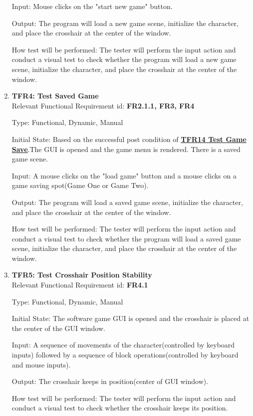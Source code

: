 \documentclass[12pt, titlepage]{article}
\begin{document}
\begin{enumerate}
Input: Mouse clicks on the "start new game" button.

Output: The program will load a new game scene, initialize the character, and place the crosshair at the center of the window.

How test will be performed: The tester will perform the input action and conduct a visual test to check whether the program will load a new game scene, initialize the character, and place the crosshair at the center of the window.

\item{\textbf{TFR4: Test Saved Game}\\}\label{saved}
Relevant Functional Requirement id: \textbf{FR2.1.1, FR3, FR4}

Type: Functional, Dynamic, Manual

Initial State:  Based on the successful post condition of \hyperref[save]{\textbf{TFR14 Test Game Save}}.The GUI is opened and the game menu is rendered. There is a saved game scene.

Input: A mouse clicks on the "load game" button and a mouse clicks on a game saving spot(Game One or Game Two).

Output: The program will load a saved game scene, initialize the character, and place the crosshair at the center of the window.

How test will be performed: The tester will perform the input action and conduct a visual test to check whether the program will load a saved game scene, initialize the character, and place the crosshair at the center of the window.

\item{\textbf{TFR5: Test Crosshair Position Stability}\\}
Relevant Functional Requirement id: \textbf{FR4.1}

Type: Functional, Dynamic, Manual

Initial State: The software game GUI is opened and the crosshair is placed at the center of the GUI window.

Input: A sequence of movements of the character(controlled by keyboard inputs) followed by a sequence of block operations(controlled by keyboard and mouse inputs).

Output: The crosshair keeps in position(center of GUI window).

How test will be performed: The tester will perform the input action and conduct a visual test to check whether the crosshair keeps its position.


\end{enumerate}
\end{document}
